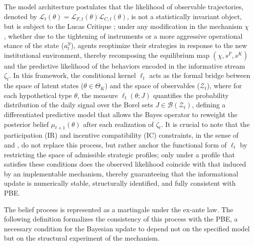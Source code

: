 \documentclass[review,authoryear,12pt]{elsarticle}
\theoremstyle{plain}
\theoremstyle{definition}
\newcommand{\ThetaK}{\Theta_K}
\newcommand{\1}{\mathbf{1}}
\begin{document}
The model architecture postulates that the likelihood of observable trajectories, denoted by $\mathcal{L}_t(\theta)=\mathcal{L}_{F,t}(\theta)\mathcal{L}_{C,t}(\theta)$, is not a statistically invariant object, but is subject to the Lucas Critique \citeyearpar{Lucas1976}; under any modification in the mechanism $\chi$, whether due to the tightening of instruments or a more aggressive operational stance of the state ($a_t^S$), agents reoptimize their strategies in response to the new institutional environment, thereby recomposing the equilibrium map $(\chi, s^F, s^K)$ and the predictive likelihood of the behaviors encoded in the informative stream $\zeta_t$. In this framework, the conditional kernel $\ell_t$ acts as the formal bridge between the space of latent states ($\theta \in \ThetaK$) and the space of observables ($\mathcal{Z}_t$), where for each hypothetical type $\theta$, the measure $\ell_t(\theta; J)$ quantifies the probability distribution of the daily signal over the Borel sets $J \in \mathcal{B}(\mathcal{Z}_t)$, defining a differentiated predictive model that allows the Bayes operator to reweight the posterior belief $\mu_{t+1}(\theta)$ after each realization of $\zeta_t$. It is crucial to note that the participation (IR) and incentive compatibility (IC) constraints, in the sense of \citet{Myerson1979IC} and \citet{BoltonDewatripont2005}, do not replace this process, but rather anchor the functional form of $\ell_t$ by restricting the space of admissible strategic profiles; only under a profile that satisfies these conditions does the observed likelihood coincide with that induced by an implementable mechanism, thereby guaranteeing that the informational update is numerically stable, structurally identified, and fully consistent with PBE.

The belief process is represented as a martingale under the ex-ante law. The following definition formalizes the consistency of this process with the PBE, a necessary condition for the Bayesian update to depend not on the specified model but on the structural experiment of the mechanism.
\end{document}
